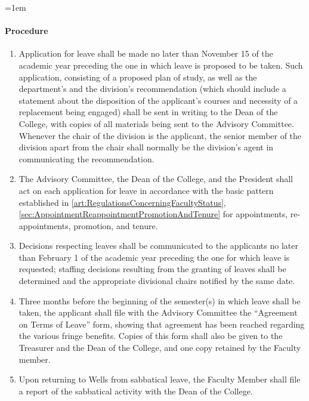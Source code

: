 \documentclass{manual}
\let\oldparagraph\paragraph
\renewcommand\paragraph{\leftskip=1em\oldparagraph}
\newcommand{\itemLevelA}{\alph*.}
\newcommand{\itemRefA}{\alph*}
\begin{document}
\paragraph{Procedure}
\begin{enumerate}[label=\itemLevelA,ref=\itemRefA]

\item Application for leave shall be made no later than November 15 of the academic year preceding the one in which leave is proposed to be taken. Such application, consisting of a proposed plan of study, as well as the department's and the division's recommendation (which should include a statement about the disposition of the applicant's courses and necessity of a replacement being engaged) shall be sent in writing to the Dean of the College, with copies of all materials being sent to the Advisory Committee. Whenever the chair of the division is the applicant, the senior member of the division apart from the chair shall normally be the division's agent in communicating the recommendation.


\item The Advisory Committee, the Dean of the College, and the President shall act on each application for leave in accordance with the basic pattern established in \cref{art:RegulationsConcerningFacultyStatus}, \cref{sec:AppointmentReappointmentPromotionAndTenure} for appointments, re-appointments, promotion, and tenure.


\item Decisions respecting leaves shall be communicated to the applicants no later than February 1 of the academic year preceding the one for which leave is requested; staffing decisions resulting from the granting of leaves shall be determined and the appropriate divisional chairs notified by the same date.


\item Three months before the beginning of the semester(s) in which leave shall be taken, the applicant shall file with the Advisory Committee the ``Agreement on Terms of Leave'' form, showing that agreement has been reached regarding the various fringe benefits. Copies of this form shall also be given to the Treasurer and the Dean of the College, and one copy retained by the Faculty member.


\item Upon returning to Wells from sabbatical leave, the Faculty Member shall file a report of the sabbatical activity with the Dean of the College.
\end{enumerate}
\end{document}
